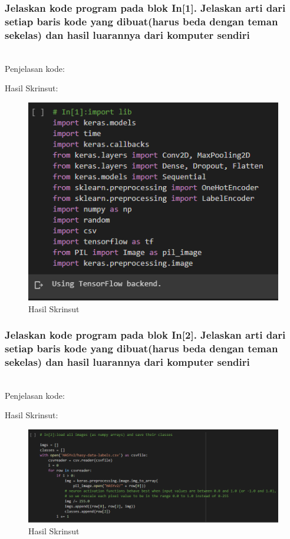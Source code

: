 \subsubsection{Jelaskan kode program pada blok  In[1]. Jelaskan arti dari setiap baris kode yang dibuat(harus beda dengan teman sekelas) dan hasil luarannya dari komputer sendiri}
\hfill\\
Penjelasan kode:

Hasil Skrinsut:
\begin{figure}[H]
	\centering
	\includegraphics[scale=0.5]{figures/1174083/figures7/p1.png}
	\caption{Hasil Skrinsut}
\end{figure}


\subsubsection{Jelaskan kode program pada blok  In[2]. Jelaskan arti dari setiap baris kode yang dibuat(harus beda dengan teman sekelas) dan hasil luarannya dari komputer sendiri}
\hfill\\
Penjelasan kode:

Hasil Skrinsut:
\begin{figure}[H]
	\centering
	\includegraphics[scale=0.5]{figures/1174083/figures7/p2.png}
	\caption{Hasil Skrinsut}
\end{figure}



